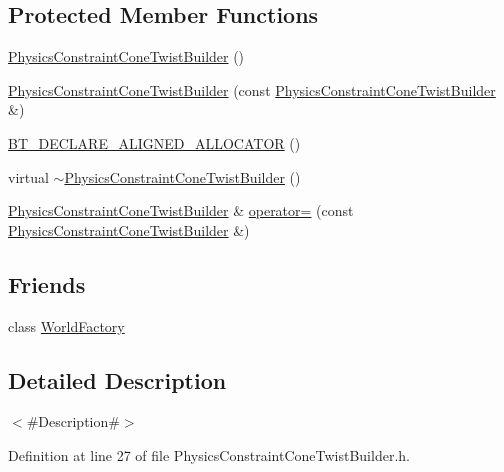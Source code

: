 \subsection*{Protected Member Functions}
\begin{DoxyCompactItemize}
\item 
\mbox{\hyperlink{classnjli_1_1_physics_constraint_cone_twist_builder_af16141b2bedca7a585957ddc7d48e4a0}{Physics\+Constraint\+Cone\+Twist\+Builder}} ()
\item 
\mbox{\hyperlink{classnjli_1_1_physics_constraint_cone_twist_builder_afab8a85fb10dc345be8773da4aed2e55}{Physics\+Constraint\+Cone\+Twist\+Builder}} (const \mbox{\hyperlink{classnjli_1_1_physics_constraint_cone_twist_builder}{Physics\+Constraint\+Cone\+Twist\+Builder}} \&)
\item 
\mbox{\hyperlink{classnjli_1_1_physics_constraint_cone_twist_builder_a9911d604a6e4c1962c4140b64ba5fd71}{B\+T\+\_\+\+D\+E\+C\+L\+A\+R\+E\+\_\+\+A\+L\+I\+G\+N\+E\+D\+\_\+\+A\+L\+L\+O\+C\+A\+T\+OR}} ()
\item 
virtual \mbox{\hyperlink{classnjli_1_1_physics_constraint_cone_twist_builder_ae3097c9cb39ba656481a238eb120aab3}{$\sim$\+Physics\+Constraint\+Cone\+Twist\+Builder}} ()
\item 
\mbox{\hyperlink{classnjli_1_1_physics_constraint_cone_twist_builder}{Physics\+Constraint\+Cone\+Twist\+Builder}} \& \mbox{\hyperlink{classnjli_1_1_physics_constraint_cone_twist_builder_a327bb06dbe264a762b3366e28ba7e3ce}{operator=}} (const \mbox{\hyperlink{classnjli_1_1_physics_constraint_cone_twist_builder}{Physics\+Constraint\+Cone\+Twist\+Builder}} \&)
\end{DoxyCompactItemize}
\subsection*{Friends}
\begin{DoxyCompactItemize}
\item 
class \mbox{\hyperlink{classnjli_1_1_physics_constraint_cone_twist_builder_acb96ebb09abe8f2a37a915a842babfac}{World\+Factory}}
\end{DoxyCompactItemize}


\subsection{Detailed Description}
$<$\#\+Description\#$>$ 

Definition at line 27 of file Physics\+Constraint\+Cone\+Twist\+Builder.\+h.



